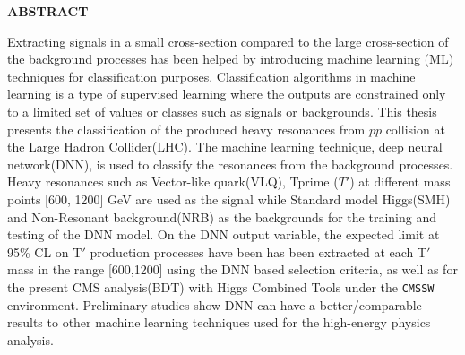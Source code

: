 \begin{center}
{\large {\bf  ABSTRACT }}

\end{center}  


 

Extracting signals in a small cross-section compared to the large cross-section of the background processes has been helped by introducing machine learning (ML) techniques for classification purposes. Classification algorithms in machine learning is a type of supervised learning where the outputs are constrained only to a limited set of values or classes such as signals or backgrounds. This thesis presents the classification of the produced heavy resonances from $pp$ collision at the Large Hadron Collider(LHC). The machine learning technique, deep neural network(DNN), is used to classify the resonances from the background processes. Heavy resonances such as Vector-like quark(VLQ), Tprime ($T'$) at different mass points [600, 1200] GeV are used as the signal while Standard model Higgs(SMH) and Non-Resonant background(NRB) as the backgrounds for the training and testing of the DNN model. On the DNN output variable, the expected limit at 95\% CL on T$'$ production processes have been has been extracted at each  T$'$ mass in the range
[600,1200] using the DNN based selection criteria, as well as for the present CMS analysis(BDT) with Higgs Combined Tools under the \texttt{CMSSW} environment. Preliminary studies show DNN can have a better/comparable results to other machine learning techniques used for the high-energy physics analysis.